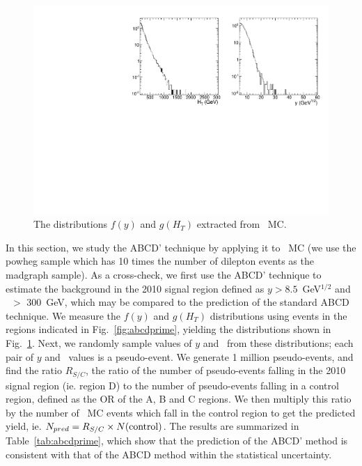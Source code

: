 \begin{figure}[tbh]
\begin{center}
\includegraphics[width=1\linewidth]{plots/abcdprimedist.pdf}
\caption{\label{fig:abcddist}\protect The distributions $f(y)$ and $g(H_T)$ 
extracted from \ttbar\ MC.}
\end{center}
\end{figure}

In this section, we study the ABCD' technique by applying it to \ttbar\ MC (we use the powheg sample which has
10 times the number of dilepton events as the madgraph sample). As a cross-check,
we first use the ABCD' technique to estimate the background in the 2010 signal region
defined as $y > 8.5$~GeV$^{1/2}$ and \Ht\ $>$ 300~GeV, which may be compared to the 
prediction of the standard ABCD technique. We measure the $f(y)$ and $g(H_T)$ distributions
using events in the regions indicated in Fig.~\ref{fig:abcdprime}, yielding the
distributions shown in Fig.~\ref{fig:abcddist}. Next, we randomly sample values of $y$
and \Ht\ from these distributions; each pair of $y$ and \Ht\ values is a pseudo-event.
We generate 1 million pseudo-events, and find the ratio $R_{S/C}$, the ratio of the
number of pseudo-events falling in the 2010 signal region (ie. region D) to the number of pseudo-events
falling in a control region, defined as the OR of the A, B and C regions. We then
multiply this ratio by the number of \ttbar\ MC events which fall in the control region
to get the predicted yield, ie. $N_{pred} = R_{S/C} \times N({\rm control})$. The results
are summarized in Table~\ref{tab:abcdprime}, which show that the prediction of the
ABCD' method is consistent with that of the ABCD method within the statistical uncertainty.

